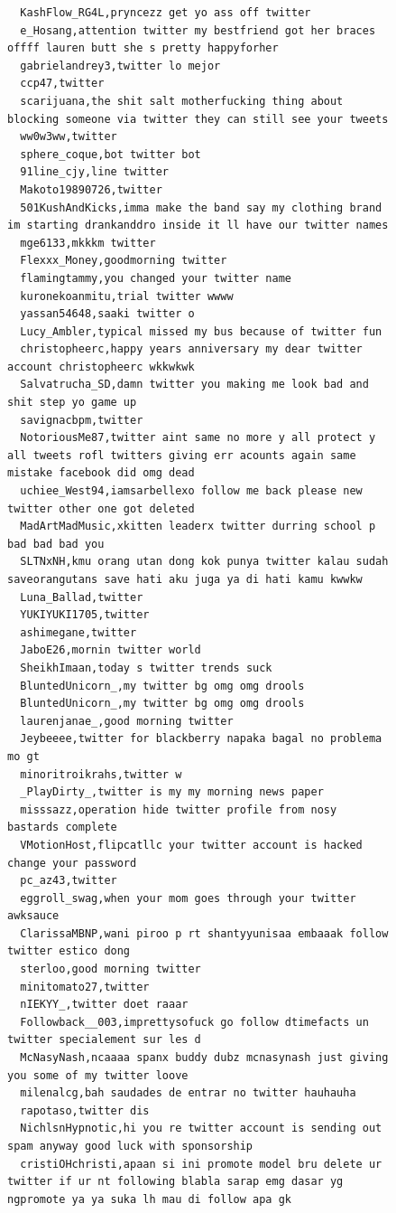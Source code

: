 \begin{figure}[htpb]
\begin{verbatim}
  KashFlow_RG4L,pryncezz get yo ass off twitter
  e_Hosang,attention twitter my bestfriend got her braces offff lauren butt she s pretty happyforher
  gabrielandrey3,twitter lo mejor
  ccp47,twitter
  scarijuana,the shit salt motherfucking thing about blocking someone via twitter they can still see your tweets
  ww0w3ww,twitter
  sphere_coque,bot twitter bot
  91line_cjy,line twitter
  Makoto19890726,twitter
  501KushAndKicks,imma make the band say my clothing brand im starting drankanddro inside it ll have our twitter names
  mge6133,mkkkm twitter
  Flexxx_Money,goodmorning twitter
  flamingtammy,you changed your twitter name
  kuronekoanmitu,trial twitter wwww
  yassan54648,saaki twitter o
  Lucy_Ambler,typical missed my bus because of twitter fun
  christopheerc,happy years anniversary my dear twitter account christopheerc wkkwkwk
  Salvatrucha_SD,damn twitter you making me look bad and shit step yo game up
  savignacbpm,twitter
  NotoriousMe87,twitter aint same no more y all protect y all tweets rofl twitters giving err acounts again same mistake facebook did omg dead
  uchiee_West94,iamsarbellexo follow me back please new twitter other one got deleted
  MadArtMadMusic,xkitten leaderx twitter durring school p bad bad bad you
  SLTNxNH,kmu orang utan dong kok punya twitter kalau sudah saveorangutans save hati aku juga ya di hati kamu kwwkw
  Luna_Ballad,twitter
  YUKIYUKI1705,twitter
  ashimegane,twitter
  JaboE26,mornin twitter world
  SheikhImaan,today s twitter trends suck
  BluntedUnicorn_,my twitter bg omg omg drools
  BluntedUnicorn_,my twitter bg omg omg drools
  laurenjanae_,good morning twitter
  Jeybeeee,twitter for blackberry napaka bagal no problema mo gt
  minoritroikrahs,twitter w
  _PlayDirty_,twitter is my my morning news paper
  misssazz,operation hide twitter profile from nosy bastards complete
  VMotionHost,flipcatllc your twitter account is hacked change your password
  pc_az43,twitter
  eggroll_swag,when your mom goes through your twitter awksauce
  ClarissaMBNP,wani piroo p rt shantyyunisaa embaaak follow twitter estico dong
  sterloo,good morning twitter
  minitomato27,twitter
  nIEKYY_,twitter doet raaar
  Followback__003,imprettysofuck go follow dtimefacts un twitter specialement sur les d
  McNasyNash,ncaaaa spanx buddy dubz mcnasynash just giving you some of my twitter loove
  milenalcg,bah saudades de entrar no twitter hauhauha
  rapotaso,twitter dis
  NichlsnHypnotic,hi you re twitter account is sending out spam anyway good luck with sponsorship
  cristiOHchristi,apaan si ini promote model bru delete ur twitter if ur nt following blabla sarap emg dasar yg ngpromote ya ya suka lh mau di follow apa gk

\end{verbatim}
\end{figure}
